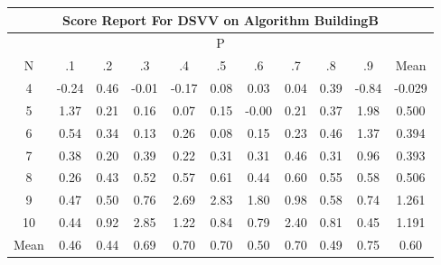 \documentclass[11pt,a4paper]{report}
\begin{document}
\begin{longtable}{ | c || c | c | c | c | c | c | c | c | c || c |}
\hline
\multicolumn{11}{|c|}{ Score Report For DSVV on Algorithm BuildingB} \\
\hline
\multicolumn{11}{|c|}{ P } \\
\hline
N & .1 & .2 & .3 & .4 & .5 & .6 & .7 & .8 & .9 & Mean\\
 \hline
 \hline
 \endhead
  4 &  \cellcolor[HTML]{FFF7F7} -0.24 &  \cellcolor[HTML]{F7F7FF} 0.46 &  \cellcolor[HTML]{FFFFFF} -0.01 &  \cellcolor[HTML]{FFF7F7} -0.17 &  \cellcolor[HTML]{FFFFFF} 0.08 &  \cellcolor[HTML]{FFFFFF} 0.03 &  \cellcolor[HTML]{FFFFFF} 0.04 &  \cellcolor[HTML]{F7F7FF} 0.39 &  \cellcolor[HTML]{FFE7E7} -0.84 & -0.029 \\
  5 &  \cellcolor[HTML]{DFDFFF} 1.37 &  \cellcolor[HTML]{F7F7FF} 0.21 &  \cellcolor[HTML]{FFFFFF} 0.16 &  \cellcolor[HTML]{FFFFFF} 0.07 &  \cellcolor[HTML]{FFFFFF} 0.15 &  \cellcolor[HTML]{FFFFFF} -0.00 &  \cellcolor[HTML]{F7F7FF} 0.21 &  \cellcolor[HTML]{F7F7FF} 0.37 &  \cellcolor[HTML]{CFCFFF} 1.98 & 0.500 \\
  6 &  \cellcolor[HTML]{EFEFFF} 0.54 &  \cellcolor[HTML]{F7F7FF} 0.34 &  \cellcolor[HTML]{FFFFFF} 0.13 &  \cellcolor[HTML]{F7F7FF} 0.26 &  \cellcolor[HTML]{FFFFFF} 0.08 &  \cellcolor[HTML]{FFFFFF} 0.15 &  \cellcolor[HTML]{F7F7FF} 0.23 &  \cellcolor[HTML]{F7F7FF} 0.46 &  \cellcolor[HTML]{DFDFFF} 1.37 & 0.394 \\
  7 &  \cellcolor[HTML]{F7F7FF} 0.38 &  \cellcolor[HTML]{F7F7FF} 0.20 &  \cellcolor[HTML]{F7F7FF} 0.39 &  \cellcolor[HTML]{F7F7FF} 0.22 &  \cellcolor[HTML]{F7F7FF} 0.31 &  \cellcolor[HTML]{F7F7FF} 0.31 &  \cellcolor[HTML]{F7F7FF} 0.46 &  \cellcolor[HTML]{F7F7FF} 0.31 &  \cellcolor[HTML]{E7E7FF} 0.96 & 0.393 \\
  8 &  \cellcolor[HTML]{F7F7FF} 0.26 &  \cellcolor[HTML]{F7F7FF} 0.43 &  \cellcolor[HTML]{EFEFFF} 0.52 &  \cellcolor[HTML]{EFEFFF} 0.57 &  \cellcolor[HTML]{EFEFFF} 0.61 &  \cellcolor[HTML]{F7F7FF} 0.44 &  \cellcolor[HTML]{EFEFFF} 0.60 &  \cellcolor[HTML]{EFEFFF} 0.55 &  \cellcolor[HTML]{EFEFFF} 0.58 & 0.506 \\
  9 &  \cellcolor[HTML]{F7F7FF} 0.47 &  \cellcolor[HTML]{EFEFFF} 0.50 &  \cellcolor[HTML]{EFEFFF} 0.76 &  \cellcolor[HTML]{BFBFFF} 2.69 &  \cellcolor[HTML]{B7B7FF} 2.83 &  \cellcolor[HTML]{CFCFFF} 1.80 &  \cellcolor[HTML]{E7E7FF} 0.98 &  \cellcolor[HTML]{EFEFFF} 0.58 &  \cellcolor[HTML]{EFEFFF} 0.74 & 1.261 \\
  10 &  \cellcolor[HTML]{F7F7FF} 0.44 &  \cellcolor[HTML]{E7E7FF} 0.92 &  \cellcolor[HTML]{B7B7FF} 2.85 &  \cellcolor[HTML]{DFDFFF} 1.22 &  \cellcolor[HTML]{E7E7FF} 0.84 &  \cellcolor[HTML]{EFEFFF} 0.79 &  \cellcolor[HTML]{BFBFFF} 2.40 &  \cellcolor[HTML]{E7E7FF} 0.81 &  \cellcolor[HTML]{F7F7FF} 0.45 & 1.191 \\
 \hline
 \hline
Mean &  \cellcolor[HTML]{F7F7FF} 0.46 &  \cellcolor[HTML]{F7F7FF} 0.44 &  \cellcolor[HTML]{EFEFFF} 0.69 &  \cellcolor[HTML]{EFEFFF} 0.70 &  \cellcolor[HTML]{EFEFFF} 0.70 &  \cellcolor[HTML]{EFEFFF} 0.50 &  \cellcolor[HTML]{EFEFFF} 0.70 &  \cellcolor[HTML]{EFEFFF} 0.49 &  \cellcolor[HTML]{EFEFFF} 0.75 &  \cellcolor[HTML]{EFEFFF} 0.60
\end{longtable}
\end{document}
